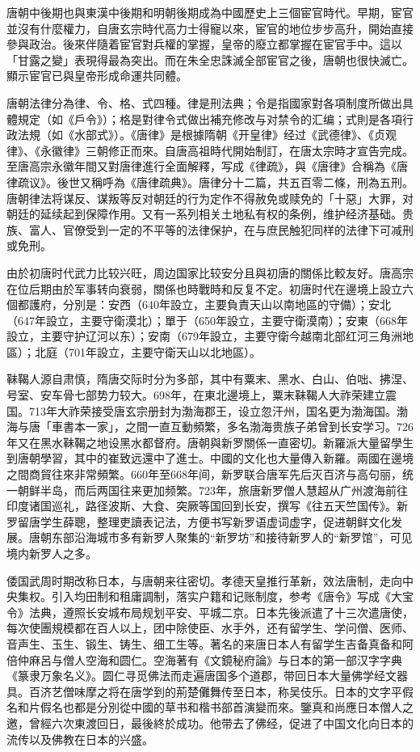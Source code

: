 唐朝中後期也與東漢中後期和明朝後期成為中國歷史上三個宦官時代。早期，宦官並沒有什麼權力，自唐玄宗時代高力士得寵以來，宦官的地位步步高升，開始直接參與政治。後來伴隨着宦官對兵權的掌握，皇帝的廢立都掌握在宦官手中。這以「甘露之變」表現得最為突出。而在朱全忠誅滅全部宦官之後，唐朝也很快滅亡。顯示宦官已與皇帝形成命運共同體。

唐朝法律分為律、令、格、式四種。律是刑法典；令是指國家對各項制度所做出具體規定（如《戶令》）；格是對律令式做出補充修改与对禁令的汇编；式則是各項行政法規（如《水部式》）。《唐律》是根據隋朝《开皇律》经过《武德律》、《贞观律》、《永徽律》三朝修正而來。自唐高祖時代開始制訂，在唐太宗時才宣告完成。至唐高宗永徽年間又對唐律進行全面解釋，写成《律疏》，與《唐律》合稱為《唐律疏议》。後世又稱呼為《唐律疏典》。唐律分十二篇，共五百零二條，刑為五刑。唐朝律法将谋反、谋叛等反对朝廷的行为定作不得赦免或赎免的「十惡」大罪，对朝廷的延续起到保障作用。又有一系列相关土地私有权的条例，维护经济基础。贵族、富人、官僚受到一定的不平等的法律保护，在与庶民触犯同样的法律下可减刑或免刑。

由於初唐时代武力比较兴旺，周边国家比较安分且與初唐的關係比較友好。唐高宗在位后期由於军事转向衰弱，關係也時戰時和反复不定。初唐时代在邊境上設立六個都護府，分別是：安西（640年設立，主要負責天山以南地區的守備）；安北（647年設立，主要守衛漠北）；單于（650年設立，主要守衛漠南）；安東（668年設立，主要守护辽河以东）；安南（679年設立，主要守衛今越南北部红河三角洲地區）；北庭（701年設立，主要守衛天山以北地區）。

靺鞨人源自肃慎，隋唐交际时分为多部，其中有粟末、黑水、白山、伯咄、拂涅、号室、安车骨七部势力较大。698年，在東北邊境上，粟末靺鞨人大祚荣建立震国。713年大祚荣接受唐玄宗册封为渤海郡王，设立忽汗州，国名更为渤海国。渤海与唐「車書本一家」，之間一直互動頻繁，多名渤海贵族子弟曾到长安学习。726年又在黑水靺鞨之地设黑水都督府。唐朝與新罗關係一直密切。新羅派大量留學生到唐朝學習，其中的崔致远還中了進士。中國的文化也大量傳入新羅。兩國在邊境之間商貿往來非常頻繁。660年至668年间，新罗联合唐军先后灭百济与高句丽，统一朝鲜半岛，而后两国往来更加频繁。723年，旅唐新罗僧人慧超从广州渡海前往印度诸国巡礼，路径波斯、大食、突厥等国回到长安，撰写《往五天竺国传》。新罗留唐学生薛聰，整理吏讀表记法，方便书写新罗语虚词虚字，促进朝鲜文化发展。唐朝东部沿海城市多有新罗人聚集的“新罗坊”和接待新罗人的“新罗馆”，可见境内新罗人之多。

倭国武周时期改称日本，与唐朝来往密切。孝德天皇推行革新，效法唐制，走向中央集权。引入均田制和租庸調制，落实户籍和记账制度，参考《唐令》写成《大宝令》法典，遵照长安城布局规划平安、平城二京。日本先後派遣了十三次遣唐使，每次使團規模都在百人以上，团中除使臣、水手外，还有留学生、学问僧、医师、音声生、玉生、锻生、铸生、细工生等。著名的来唐日本人有留学生吉备真备和阿倍仲麻呂与僧人空海和圆仁。空海著有《文鏡秘府論》与日本的第一部汉字字典《篆隶万象名义》。圆仁寻觅佛法而走遍唐国多个道郡，带回日本大量佛学经文器具。百济艺僧味摩之将在唐学到的荊楚儺舞传至日本，称吴伎乐。日本的文字平假名和片假名也都是分別從中國的草书和楷书部首演變而來。鑒真和尚應日本僧人之邀，曾經六次東渡回日，最後終於成功。他带去了佛经，促进了中国文化向日本的流传以及佛教在日本的兴盛。

